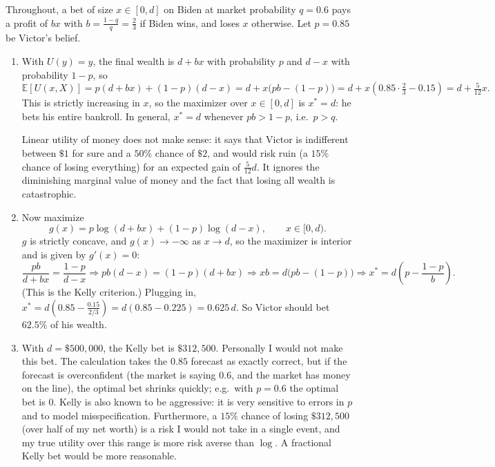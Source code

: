 \documentclass{article}
\begin{document}
\begin{solution}
  Throughout, a bet of size $x \in [0,d]$ on Biden at market probability $q = 0.6$ pays a profit of $b x$ with $b = \frac{1-q}{q} = \frac{2}{3}$ if Biden wins, and loses $x$ otherwise. Let $p = 0.85$ be Victor's belief.

  \begin{enumerate}[label=(\alph*)]
    \item With $U(y) = y$, the final wealth is $d + bx$ with probability $p$ and $d - x$ with probability $1-p$, so
      \[
        \mathbb{E}[U(x, X)] = p(d + bx) + (1-p)(d - x) = d + x\big(pb - (1-p)\big) = d + x\left(0.85 \cdot \tfrac{2}{3} - 0.15\right) = d + \tfrac{5}{12}x .
      \]
      This is strictly increasing in $x$, so the maximizer over $x \in [0,d]$ is $x^* = d$: he bets his entire bankroll. In general, $x^* = d$ whenever $pb > 1-p$, i.e.\ $p > q$.

      Linear utility of money does not make sense: it says that Victor is indifferent between $\$1$ for sure and a $50\%$ chance of $\$2$, and would risk ruin (a $15\%$ chance of losing everything) for an expected gain of $\frac{5}{12}d$. It ignores the diminishing marginal value of money and the fact that losing all wealth is catastrophic.

    \item Now maximize
      \[
        g(x) = p \log(d + bx) + (1-p)\log(d - x), \qquad x \in [0, d).
      \]
      $g$ is strictly concave, and $g(x) \to -\infty$ as $x \to d$, so the maximizer is interior and is given by $g'(x) = 0$:
      \[
        \frac{pb}{d + bx} = \frac{1-p}{d-x}
        \Longrightarrow pb(d-x) = (1-p)(d+bx)
        \Longrightarrow x b = d\big(pb - (1-p)\big)
        \Longrightarrow x^* = d\left(p - \frac{1-p}{b}\right).
      \]
      (This is the Kelly criterion.) Plugging in, $x^* = d\left(0.85 - \frac{0.15}{2/3}\right) = d(0.85 - 0.225) = 0.625\,d$. So Victor should bet $62.5\%$ of his wealth.

    \item With $d = \$500{,}000$, the Kelly bet is $\$312{,}500$. Personally I would not make this bet. The calculation takes the $0.85$ forecast as exactly correct, but if the forecast is overconfident (the market is saying $0.6$, and the market has money on the line), the optimal bet shrinks quickly; e.g.\ with $p = 0.6$ the optimal bet is $0$. Kelly is also known to be aggressive: it is very sensitive to errors in $p$ and to model misspecification. Furthermore, a $15\%$ chance of losing $\$312{,}500$ (over half of my net worth) is a risk I would not take in a single event, and my true utility over this range is more risk averse than $\log$. A fractional Kelly bet would be more reasonable.
  \end{enumerate}
\end{solution}
\end{document}
